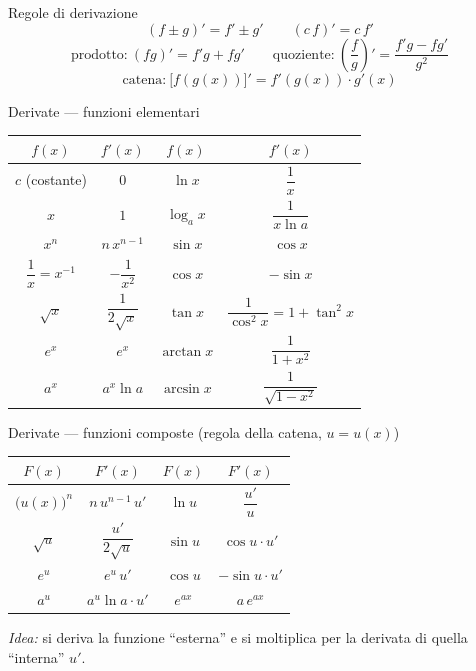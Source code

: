 \documentclass[11pt]{article}
\begin{document}
\begin{concetto}[barSlate]{Regole di derivazione}
\[ (f\pm g)' = f'\pm g' \qquad (c\,f)' = c\,f' \]
\[ \text{prodotto:}\ (fg)' = f'g + fg' \qquad \text{quoziente:}\ \left(\frac{f}{g}\right)' = \frac{f'g - fg'}{g^2} \]
\[ \text{catena:}\ \big[f(g(x))\big]' = f'(g(x))\cdot g'(x) \]
\end{concetto}

\begin{concetto}[barSlate]{Derivate --- funzioni elementari}
\renewcommand{\arraystretch}{1.7}
\begin{center}
\begin{tabular}{c|c@{\hskip 3em}c|c}
$f(x)$ & $f'(x)$ & $f(x)$ & $f'(x)$ \\
\hline
$c$ (costante) & $0$ & $\ln x$ & $\dfrac{1}{x}$ \\
$x$ & $1$ & $\log_a x$ & $\dfrac{1}{x\ln a}$ \\
$x^n$ & $n\,x^{n-1}$ & $\sin x$ & $\cos x$ \\
$\dfrac{1}{x}=x^{-1}$ & $-\dfrac{1}{x^2}$ & $\cos x$ & $-\sin x$ \\
$\sqrt{x}$ & $\dfrac{1}{2\sqrt{x}}$ & $\tan x$ & $\dfrac{1}{\cos^2 x}=1+\tan^2 x$ \\
$e^{x}$ & $e^{x}$ & $\arctan x$ & $\dfrac{1}{1+x^2}$ \\
$a^{x}$ & $a^{x}\ln a$ & $\arcsin x$ & $\dfrac{1}{\sqrt{1-x^2}}$ \\
\end{tabular}
\end{center}
\renewcommand{\arraystretch}{1}
\end{concetto}

\begin{concetto}[barSlate]{Derivate --- funzioni composte (regola della catena, $u=u(x)$)}
\renewcommand{\arraystretch}{1.8}
\begin{center}
\begin{tabular}{c|c@{\hskip 3em}c|c}
$F(x)$ & $F'(x)$ & $F(x)$ & $F'(x)$ \\
\hline
$\big(u(x)\big)^n$ & $n\,u^{n-1}\,u'$ & $\ln u$ & $\dfrac{u'}{u}$ \\
$\sqrt{u}$ & $\dfrac{u'}{2\sqrt{u}}$ & $\sin u$ & $\cos u\cdot u'$ \\
$e^{u}$ & $e^{u}\,u'$ & $\cos u$ & $-\sin u\cdot u'$ \\
$a^{u}$ & $a^{u}\ln a\cdot u'$ & $e^{ax}$ & $a\,e^{ax}$ \\
\end{tabular}
\end{center}
\renewcommand{\arraystretch}{1}
\emph{Idea:} si deriva la funzione ``esterna'' e si moltiplica per la derivata di quella ``interna'' $u'$.
\end{concetto}
\end{document}

